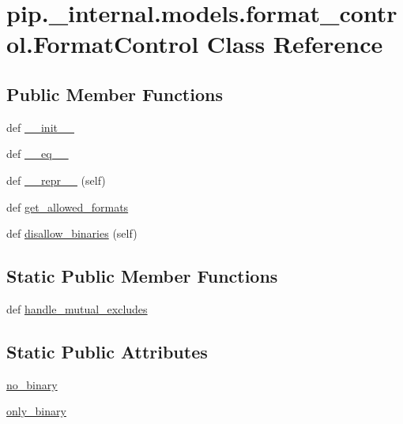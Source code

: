\hypertarget{classpip_1_1__internal_1_1models_1_1format__control_1_1FormatControl}{}\section{pip.\+\_\+internal.\+models.\+format\+\_\+control.\+Format\+Control Class Reference}
\label{classpip_1_1__internal_1_1models_1_1format__control_1_1FormatControl}
\subsection*{Public Member Functions}
\begin{DoxyCompactItemize}
\item 
def \hyperlink{classpip_1_1__internal_1_1models_1_1format__control_1_1FormatControl_ab2fb74aabd01c0ccf1cf5933a481e6e7}{\+\_\+\+\_\+init\+\_\+\+\_\+}
\item 
def \hyperlink{classpip_1_1__internal_1_1models_1_1format__control_1_1FormatControl_a834a878e425868a173eef58f699ea016}{\+\_\+\+\_\+eq\+\_\+\+\_\+}
\item 
def \hyperlink{classpip_1_1__internal_1_1models_1_1format__control_1_1FormatControl_a0b87181c11e7973c64fd4c50280a664e}{\+\_\+\+\_\+repr\+\_\+\+\_\+} (self)
\item 
def \hyperlink{classpip_1_1__internal_1_1models_1_1format__control_1_1FormatControl_a19fdbac20c72fe684ea26c2667664f66}{get\+\_\+allowed\+\_\+formats}
\item 
def \hyperlink{classpip_1_1__internal_1_1models_1_1format__control_1_1FormatControl_a4aa7a67518b51ded8272361de4bb2e21}{disallow\+\_\+binaries} (self)
\end{DoxyCompactItemize}
\subsection*{Static Public Member Functions}
\begin{DoxyCompactItemize}
\item 
def \hyperlink{classpip_1_1__internal_1_1models_1_1format__control_1_1FormatControl_a897107c8f92d3f51f05691b08e781392}{handle\+\_\+mutual\+\_\+excludes}
\end{DoxyCompactItemize}
\subsection*{Static Public Attributes}
\begin{DoxyCompactItemize}
\item 
\hyperlink{classpip_1_1__internal_1_1models_1_1format__control_1_1FormatControl_adc2de6f70fea3d458f782283dd8b53ff}{no\+\_\+binary}
\item 
\hyperlink{classpip_1_1__internal_1_1models_1_1format__control_1_1FormatControl_a5ccc8975b34bae7b607610503ebd83be}{only\+\_\+binary}
\end{DoxyCompactItemize}



